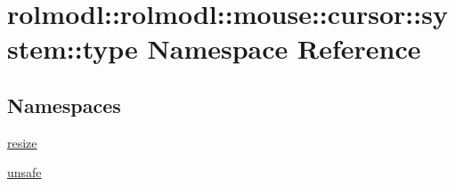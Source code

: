 \hypertarget{namespacerolmodl_1_1rolmodl_1_1mouse_1_1cursor_1_1system_1_1type}{}\section{rolmodl\+::rolmodl\+::mouse\+::cursor\+::system\+::type Namespace Reference}
\label{namespacerolmodl_1_1rolmodl_1_1mouse_1_1cursor_1_1system_1_1type}
\subsection*{Namespaces}
\begin{DoxyCompactItemize}
\item 
 \mbox{\hyperlink{namespacerolmodl_1_1rolmodl_1_1mouse_1_1cursor_1_1system_1_1type_1_1resize}{resize}}
\item 
 \mbox{\hyperlink{namespacerolmodl_1_1rolmodl_1_1mouse_1_1cursor_1_1system_1_1type_1_1unsafe}{unsafe}}
\end{DoxyCompactItemize}
